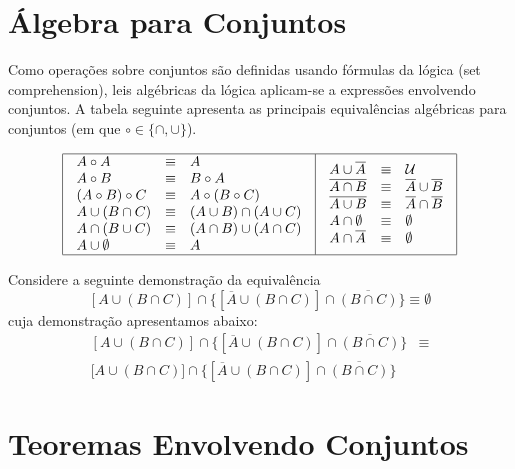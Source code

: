 \section{Álgebra para Conjuntos}

Como operações sobre conjuntos são definidas usando fórmulas da lógica
(set comprehension), leis algébricas da lógica aplicam-se a expressões
envolvendo conjuntos. A tabela seguinte apresenta as principais
equivalências algébricas para conjuntos (em que $\circ\in\{\cap,\cup\}$).

\[
\begin{array}{|l|l|}
  \hline
  \begin{array}{lcl}
    A \circ A & \equiv & A\\
    A \circ B & \equiv & B \circ A \\
    (A \circ B) \circ C & \equiv & A \circ (B\circ C) \\
    A \cup (B\cap C) & \equiv & (A \cup B) \cap (A\cup C)\\
    A \cap (B\cup C) & \equiv & (A \cap B)\cup (A\cap C) \\
    A \cup \emptyset & \equiv & A \\
  \end{array} &
  \begin{array}{lcl}
    A \cup \overline{A} & \equiv & \mathcal{U} \\
    \overline{A\cap B} & \equiv & \overline{A}\cup\overline{B}\\
    \overline{A\cup B} & \equiv & \overline{A}\cap\overline{B}\\
    A \cap \emptyset & \equiv & \emptyset\\
    A \cap \overline{A} & \equiv & \emptyset\\
  \end{array}
  \\ \hline
\end{array}
\]
\begin{Example}
Considere a seguinte demonstração da equivalência
\[
[A \cup (B\cap C)]\cap\{[\overline{A}\cup(B\cap C)]\cap \overline{(B\cap C)}\} \equiv \emptyset
\]
cuja demonstração apresentamos abaixo:
\[
\begin{array}{lc}
[A\cup (B\cap C)]\cap\{[\overline{A}\cup (B\cap
C)]\cap\overline{(B\cap C)}\} &\equiv \\
\lbrack A\cup (B\cap C) \rbrack \cap\{[\overline{A}\cup (B\cap
C)]\cap\overline{(B\cap C)}\}
\end{array}
\]

\end{Example}

\section{Teoremas Envolvendo Conjuntos}